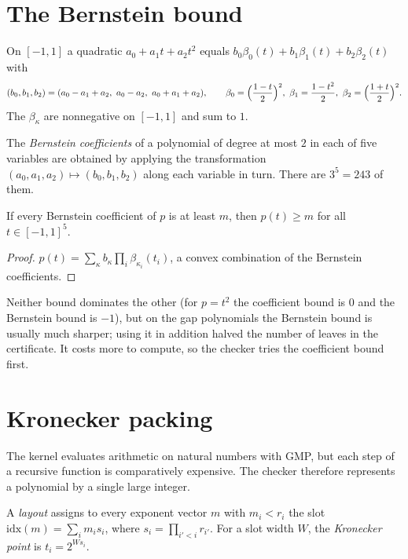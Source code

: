 \section{The Bernstein bound}

On $[-1, 1]$ a quadratic $a_0 + a_1 t + a_2 t^2$ equals
$b_0 \beta_0(t) + b_1 \beta_1(t) + b_2 \beta_2(t)$ with
\[
  (b_0, b_1, b_2) = (a_0 - a_1 + a_2,\ a_0 - a_2,\ a_0 + a_1 + a_2),\qquad
  \beta_0 = \Bigl(\frac{1 - t}{2}\Bigr)^2,\ \beta_1 = \frac{1 - t^2}{2},\ \beta_2 = \Bigl(\frac{1 + t}{2}\Bigr)^2.
\]
The $\beta_\kappa$ are nonnegative on $[-1, 1]$ and sum to $1$.

\begin{definition}
\label{def:bernstein}
\leanok
{}
The \emph{Bernstein coefficients} of a polynomial of degree at most $2$ in each of five
variables are obtained by applying the transformation $(a_0, a_1, a_2) \mapsto (b_0, b_1, b_2)$
along each variable in turn. There are $3^5 = 243$ of them.
\end{definition}

\begin{theorem}
\label{thm:bern_bound}
\leanok
{}
If every Bernstein coefficient of $p$ is at least $m$, then $p(t) \ge m$ for all
$t \in [-1,1]^5$.
\end{theorem}
\begin{proof}
\leanok
$p(t) = \sum_\kappa b_\kappa \prod_i \beta_{\kappa_i}(t_i)$, a convex combination of the
Bernstein coefficients.
\end{proof}

Neither bound dominates the other (for $p = t^2$ the coefficient bound is $0$ and the
Bernstein bound is $-1$), but on the gap polynomials the Bernstein bound is usually much
sharper; using it in addition halved the number of leaves in the certificate. It costs
more to compute, so the checker tries the coefficient bound first.

\section{Kronecker packing}

The kernel evaluates arithmetic on natural numbers with GMP, but each step of a
recursive function is comparatively expensive. The checker therefore represents a
polynomial by a single large integer.

\begin{definition}
\label{def:layout}
\leanok
{}
A \emph{layout} assigns to every exponent vector $m$ with $m_i < r_i$ the slot
$\mathrm{idx}(m) = \sum_i m_i s_i$, where $s_i = \prod_{i' < i} r_{i'}$. For a slot width
$W$, the \emph{Kronecker point} is $t_i = 2^{W s_i}$.
\end{definition}


